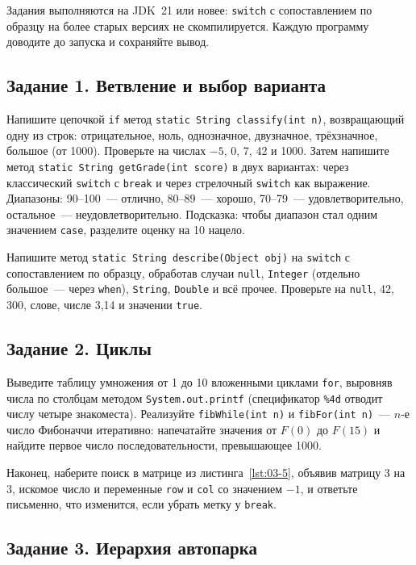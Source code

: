 \praktikum{}

Задания выполняются на JDK~21 или новее: \texttt{switch} с сопоставлением по
образцу на более старых версиях не скомпилируется. Каждую программу доводите
до запуска и сохраняйте вывод.

\subsection*{Задание 1. Ветвление и выбор варианта}

Напишите цепочкой \texttt{if} метод
\texttt{static String classify(int n)}, возвращающий одну из строк:
отрицательное, ноль, однозначное, двузначное, трёхзначное, большое (от 1000).
Проверьте на числах $-5$, 0, 7, 42 и 1000. Затем напишите метод
\texttt{static String getGrade(int score)} в двух вариантах: через классический
\texttt{switch} с \texttt{break} и через стрелочный \texttt{switch} как
выражение. Диапазоны: 90--100~--- отлично, 80--89~--- хорошо, 70--79~---
удовлетворительно, остальное~--- неудовлетворительно. Подсказка: чтобы диапазон
стал одним значением \texttt{case}, разделите оценку на 10 нацело.

Напишите метод \texttt{static String describe(Object obj)} на \texttt{switch} с
сопоставлением по образцу, обработав случаи \texttt{null}, \texttt{Integer}
(отдельно большое~--- через \texttt{when}), \texttt{String}, \texttt{Double} и
всё прочее. Проверьте на \texttt{null}, 42, 300, слове, числе 3,14 и значении
\texttt{true}.

\subsection*{Задание 2. Циклы}

Выведите таблицу умножения от 1 до 10 вложенными циклами \texttt{for}, выровняв
числа по столбцам методом \texttt{System.out.printf} (спецификатор
\texttt{\%4d} отводит числу четыре знакоместа). Реализуйте
\texttt{fibWhile(int n)} и \texttt{fibFor(int n)}~--- $n$-е число Фибоначчи
итеративно: напечатайте значения от $F(0)$ до $F(15)$ и найдите первое число
последовательности, превышающее 1000.

Наконец, наберите поиск в матрице из листинга~\ref{lst:03-5}, объявив матрицу
3 на 3, искомое число и переменные \texttt{row} и \texttt{col} со значением
$-1$, и ответьте письменно, что изменится, если убрать метку у \texttt{break}.

\subsection*{Задание 3. Иерархия автопарка}

